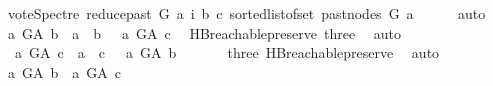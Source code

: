 \begin{isabellebody}
\ {\isacharparenleft}{\kern0pt}vote{\isacharunderscore}{\kern0pt}Spectre\ {\isacharparenleft}{\kern0pt}reduce{\isacharunderscore}{\kern0pt}past\ G\ a{\isacharparenright}{\kern0pt}\ i\ b\ c{\isacharparenright}{\kern0pt}{\isacharparenright}{\kern0pt}\ {\isacharparenleft}{\kern0pt}sorted{\isacharunderscore}{\kern0pt}list{\isacharunderscore}{\kern0pt}of{\isacharunderscore}{\kern0pt}set\ {\isacharparenleft}{\kern0pt}past{\isacharunderscore}{\kern0pt}nodes\ G\ a{\isacharparenright}{\kern0pt}{\isacharparenright}{\kern0pt}{\isacharparenright}{\kern0pt}{\isacharparenright}{\kern0pt}{\isacharparenright}{\kern0pt}{\isacharparenright}{\kern0pt}{\isachardoublequoteclose}\isanewline
\ \ \ \ \isamarkupfalse%
\ auto\isanewline
\ \ \isamarkupfalse%
\ {\isachardoublequoteopen}{\isasymnot}{\isacharparenleft}{\kern0pt}{\isacharparenleft}{\kern0pt}a\ {\isasymrightarrow}\isactrlsup {\isacharplus}{\kern0pt}\isactrlbsub G{\isacharunderscore}{\kern0pt}A\isactrlesub \ b\ {\isasymor}\ a\ {\isacharequal}{\kern0pt}\ b{\isacharparenright}{\kern0pt}\ {\isasymand}\ {\isacharparenleft}{\kern0pt}{\isasymnot}\ a\ {\isasymrightarrow}\isactrlsup {\isacharplus}{\kern0pt}\isactrlbsub G{\isacharunderscore}{\kern0pt}A\isactrlesub \ c{\isacharparenright}{\kern0pt}{\isacharparenright}{\kern0pt}{\isachardoublequoteclose}\ \isamarkupfalse%
\ HB{}{\isachardot}{\kern0pt}reachable{}{\isacharunderscore}{\kern0pt}preserve\ three\ \isamarkupfalse%
\ auto\isanewline
\ \ \isamarkupfalse%
\ \isamarkupfalse%
\ {\isachardoublequoteopen}{\isasymnot}\ {\isacharparenleft}{\kern0pt}{\isacharparenleft}{\kern0pt}a\ {\isasymrightarrow}\isactrlsup {\isacharplus}{\kern0pt}\isactrlbsub G{\isacharunderscore}{\kern0pt}A\isactrlesub \ c\ {\isasymor}\ a\ {\isacharequal}{\kern0pt}\ c{\isacharparenright}{\kern0pt}\ {\isasymand}\ {\isacharparenleft}{\kern0pt}{\isasymnot}\ a\ {\isasymrightarrow}\isactrlsup {\isacharplus}{\kern0pt}\isactrlbsub G{\isacharunderscore}{\kern0pt}A\isactrlesub \ b{\isacharparenright}{\kern0pt}{\isacharparenright}{\kern0pt}{\isachardoublequoteclose}\ \isanewline
\ \ \ \ \isamarkupfalse%
\ three\ HB{}{\isachardot}{\kern0pt}reachable{}{\isacharunderscore}{\kern0pt}preserve\ \isamarkupfalse%
\ auto\isanewline
\ \ \isamarkupfalse%
\ \isamarkupfalse%
\ {\isachardoublequoteopen}a\ {\isasymrightarrow}\isactrlsup {\isacharplus}{\kern0pt}\isactrlbsub G{\isacharunderscore}{\kern0pt}A\isactrlesub \ b\ {\isasymand}\ a\ {\isasymrightarrow}\isactrlsup {\isacharplus}{\kern0pt}\isactrlbsub G{\isacharunderscore}{\kern0pt}A\isactrlesub \ c{\isachardoublequoteclose}\ \isamarkupfalse%

\end{isabellebody}
